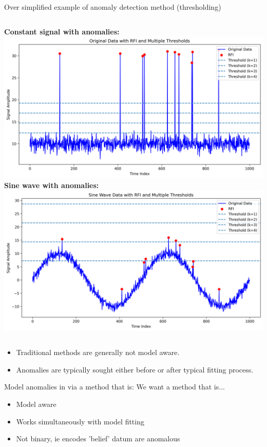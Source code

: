 \documentclass[aspectratio=169]{beamer}
\begin{document}
\begin{frame}{Over simplified example of anomaly detection method (thresholding)}
  \begin{columns}
    \textbf{Constant signal with anomalies:}
    \includegraphics[width=1\textwidth]{images/threshold_multiple.png}
    \textbf{Sine wave with anomalies:}
    \includegraphics[width=1\textwidth]{images/threshold_sin_multiple.png}
  \end{columns}
  \begin{itemize}
    \item Traditional methods are generally not model aware.
    \item Anomalies are typically sought either before or after typical fitting process.
  \end{itemize}
\end{frame}

\begin{frame}{Model anomalies in via a method that is:}
  We want a method that is...
  \begin{itemize}
    \item Model aware
    \item Works simultaneously with model fitting
    \item Not binary, ie encodes 'belief' datum are anomalous
  \end{itemize}
\end{frame}
\end{document}
